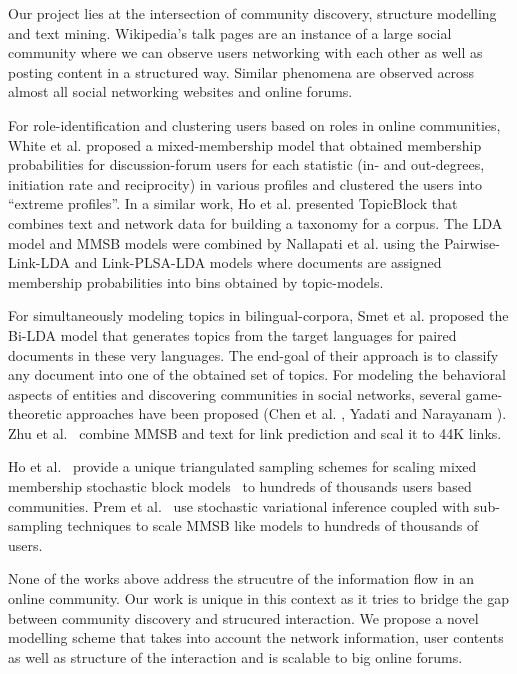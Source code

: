 Our project lies at the intersection of community discovery, structure modelling
and text mining. Wikipedia's talk pages are an instance of a large social
community where we can observe users networking with each other as well as
posting content in a structured way. Similar phenomena are observed across
almost all social networking websites and online forums.


For role-identification and clustering users based on roles in online communities, 
White et al.\cite{ICWSM124638} proposed a mixed-membership model that obtained
membership probabilities for discussion-forum users for each statistic
(in- and out-degrees, initiation rate and reciprocity) in various profiles and 
clustered the users into ``extreme profiles''. In a similar work, Ho et al.
\cite{Ho:2012:DHT:2187836.2187936} presented TopicBlock that combines text and 
network data for building a taxonomy for a corpus. 
The LDA model and MMSB models were combined by
Nallapati et al. \cite{Nallapati:2008:JLT:1401890.1401957} using the
Pairwise-Link-LDA and Link-PLSA-LDA models where documents are assigned
membership probabilities into bins obtained by topic-models.

For simultaneously modeling topics in bilingual-corpora, Smet et al.
\cite{Smet:2011:KTA:2017863.2017915} proposed the Bi-LDA model that generates
topics from the target languages for paired documents in these very languages.
The end-goal of their approach is to classify any document into one of the
obtained set of topics. For modeling the behavioral aspects of entities and
discovering communities in social networks, several game-theoretic approaches
have been proposed (Chen et al. \cite{Chen:2010:GFI:1842547.1842566}, Yadati and
Narayanam \cite{Yadati:2011:GTM:1963192.1963316}). Zhu et
al.~\cite{Zhu:getoor:MMSB-text} combine MMSB and text for link prediction and
scal it to 44K links.

Ho et al.~\cite{HoYX12} provide a unique triangulated sampling schemes for scaling
mixed membership stochastic block models~\cite{Airoldi:2008:MMS:1390681.1442798} to
hundreds of thousands users based communities. Prem et al.~\cite{conf/nips/GopalanMGFB12}
use stochastic variational inference coupled with sub-sampling techniques to
scale MMSB like models to hundreds of thousands of users.

None of the works above address the strucutre of the information flow in an
online community. Our work is unique in this context as it tries to bridge the
gap between community discovery and strucured interaction. We propose a novel
modelling scheme that takes into account the network information, user contents
as well as structure of the interaction and is scalable to big online forums.
